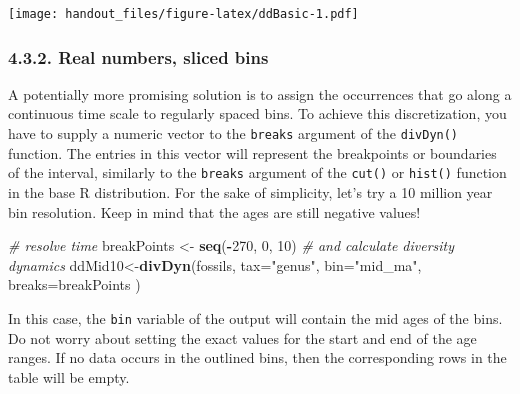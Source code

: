 \documentclass[]{article}
\newenvironment{Shaded}{\begin{snugshade}}{\end{snugshade}}
\newcommand{\CharTok}[1]{\textcolor[rgb]{0.31,0.60,0.02}{#1}}
\newcommand{\CommentTok}[1]{\textcolor[rgb]{0.56,0.35,0.01}{\textit{#1}}}
\newcommand{\DataTypeTok}[1]{\textcolor[rgb]{0.13,0.29,0.53}{#1}}
\newcommand{\DecValTok}[1]{\textcolor[rgb]{0.00,0.00,0.81}{#1}}
\newcommand{\KeywordTok}[1]{\textcolor[rgb]{0.13,0.29,0.53}{\textbf{#1}}}
\newcommand{\NormalTok}[1]{#1}
\newcommand{\OperatorTok}[1]{\textcolor[rgb]{0.81,0.36,0.00}{\textbf{#1}}}
\newcommand{\StringTok}[1]{\textcolor[rgb]{0.31,0.60,0.02}{#1}}
\begin{document}
\texttt{[image: handout\_files/figure-latex/ddBasic-1.pdf]}

\hypertarget{real-numbers-sliced-bins}{%
\subsubsection{4.3.2. Real numbers, sliced
bins}\label{real-numbers-sliced-bins}}

A potentially more promising solution is to assign the occurrences that
go along a continuous time scale to regularly spaced bins. To achieve
this discretization, you have to supply a numeric vector to the
\texttt{breaks} argument of the \texttt{divDyn()} function. The entries
in this vector will represent the breakpoints or boundaries of the
interval, similarly to the \texttt{breaks} argument of the
\texttt{cut()} or \texttt{hist()} function in the base R distribution.
For the sake of simplicity, let's try a 10 million year bin resolution.
Keep in mind that the ages are still negative values!

\begin{Shaded}
\begin{Highlighting}[]
\CommentTok{# resolve time}
\NormalTok{  breakPoints <-}\StringTok{ }\KeywordTok{seq}\NormalTok{(}\OperatorTok{-}\DecValTok{270}\NormalTok{, }\DecValTok{0}\NormalTok{, }\DecValTok{10}\NormalTok{)}
\CommentTok{# and calculate diversity dynamics}
\NormalTok{  ddMid10<-}\KeywordTok{divDyn}\NormalTok{(fossils, }\DataTypeTok{tax=}\StringTok{"genus"}\NormalTok{, }\DataTypeTok{bin=}\StringTok{"mid_ma"}\NormalTok{, }\DataTypeTok{breaks=}\NormalTok{breakPoints )}
\end{Highlighting}
\end{Shaded}

In this case, the \texttt{bin} variable of the output will contain the
mid ages of the bins. Do not worry about setting the exact values for
the start and end of the age ranges. If no data occurs in the outlined
bins, then the corresponding rows in the table will be empty.

\begin{Shaded}
\end{Shaded}
\end{document}
